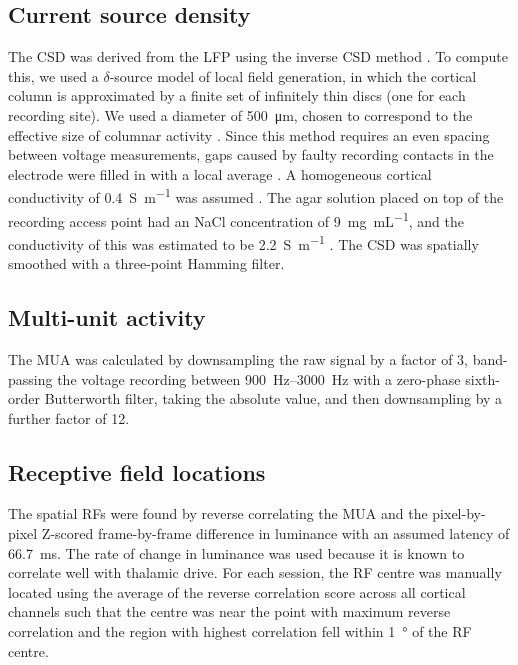 \subsection{Current source density}
\label{sec:lam_csd}

The \ac{CSD} was derived from the \ac{LFP} using the inverse \ac{CSD} method \citep{Pettersen2006}.
To compute this, we used a $\delta$-source model of local field generation, in which the cortical column is approximated by a finite set of infinitely thin discs (one for each recording site).
We used a diameter of \SI{500}{\micro\metre}, chosen to correspond to the effective size of columnar activity \citep{Horton2005,Lund2003}.
Since this method requires an even spacing between voltage measurements, gaps caused by faulty recording contacts in the electrode were filled in with a local average \citep{Wojcik2010}.
A homogeneous cortical conductivity of \SI{0.4}{\siemens\per\metre} was assumed \citep{Logothetis2007}.
The agar solution placed on top of the recording access point had an \ac{NaCl} concentration of \SI{9}{\mg\per\mL}, and the conductivity of this was estimated to be \SI{2.2}{\siemens\per\metre} \citep{Kandadai2012}.
The \ac{CSD} was spatially smoothed with a three-point Hamming filter.


\subsection{Multi-unit activity}


The \ac{MUA} was calculated by downsampling the raw signal by a factor of \num{3}, band-passing the voltage recording between \SIrange{900}{3000}{Hz} with a zero-phase sixth-order Butterworth filter, taking the absolute value, and then downsampling by a further factor of \num{12}.


\subsection{Receptive field locations}
\label{sec:lam_rf}

The spatial \acp{RF} were found by reverse correlating the \ac{MUA} and the pixel-by-pixel Z-scored frame-by-frame difference in luminance with an assumed latency of \SI{66.7}{\milli\second}.
The rate of change in luminance was used because it is known to correlate well with thalamic drive.
For each session, the \ac{RF} centre was manually located using the average of the reverse correlation score across all cortical channels such that the centre was near the point with maximum reverse correlation and the region with highest correlation fell within \SI{1}{\degree} of the \ac{RF} centre.



